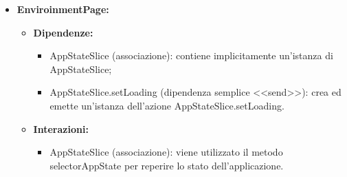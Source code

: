\begin{itemize}
    \item \textbf{EnviroinmentPage:}
    \begin{itemize}
        \item \textbf{Dipendenze:}
        \begin{itemize}
            \item AppStateSlice (associazione): contiene implicitamente un'istanza di AppStateSlice;
            \item AppStateSlice.setLoading (dipendenza semplice <<send>>):  crea ed emette un’istanza dell’azione AppStateSlice.setLoading.
        \end{itemize} 
        \item \textbf{Interazioni:}
        \begin{itemize}
            \item AppStateSlice (associazione): viene utilizzato il metodo selectorAppState per reperire lo stato dell'applicazione.
        \end{itemize}  
    \end{itemize}
\end{itemize}


